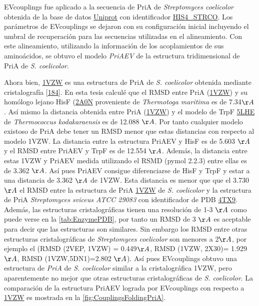 \documentclass[12pt,twoside]{reedthesis}
\begin{document}
  EVcouplings fue aplicado a la secuencia de PriA de \emph{Streptomyces
  coelicolor} obtenida de la base de datos
  \href{https://www.uniprot.org/}{Uniprot} con identificador
  \href{https://www.uniprot.org/uniprot/P16250}{HIS4\_STRCO}. Los
  parámetros de EVcouplings se dejaron con su configuración inicial
  incluyendo el umbral de recuperación para las secuencias utilizadas en
  el alineamiento. Con este alineamiento, utilizando la información de los
  acoplamientos de sus aminoácidos, se obtuvo el modelo \emph{PriAEV} de
  la estructura tridimensional de PriA de \emph{S. coelicolor}.
  
  Ahora bien, \href{https://www.rcsb.org/structure/1vzw}{1VZW} es una
  estructura de PriA de \emph{S. coelicolor} obtenida mediante
  cristalografía {[}\protect\hyperlink{ref-kuper_twofold_2005}{184}{]}. En
  esta tesis calculé que el RMSD entre PriA
  (\href{https://www.rcsb.org/structure/1vzw}{1VZW}) y su homólogo lejano
  HisF (\href{http://www.rcsb.org/structure/2A0N}{2A0N} proveniente de
  \emph{Thermotoga maritima} es de 7.34\({\AA}\). Así mismo la distancia
  obtenida entre PriA (\href{https://www.rcsb.org/structure/1vzw}{1VZW}) y
  el modelo de TrpF \href{http://www.rcsb.org/structure/5LHE}{5LHE} de
  \emph{Thermococcus kodakaraensis} es de 12.088 \({\AA}\). Por tanto
  cualquier modelo existoso de PriA debe tener un RMSD menor que estas
  distancias con respecto al modelo 1VZW. La distancia entre la estructura
  PriAEV y HisF es de 5.603 \({\AA}\) y el RMSD entre PriAEV y TrpF es de
  12.554 \({\AA}\). Además, la distancia entre estas 1VZW y PriAEV medida
  utilizando el RSMD (pymol 2.2.3) entre ellas es de 3.362 \({\AA}\). Así
  pues PriAEV consigue diferenciarse de HisF y TrpF y estar a una
  distancia de 3.362 \({\AA}\) de 1VZW. Esta distancia es menor que que el
  3.730 \({\AA}\) el RMSD entre la estructura de PriA
  \href{https://www.rcsb.org/structure/1vzw}{1VZW} de \emph{S. coelicolor}
  y la estructura de PriA \emph{Streptomyces sviceus ATCC 29083} con
  identificador de PDB \href{https://www.rcsb.org/structure/4TX9}{4TX9}.
  Además, las estructuras cristalográficas tienen una resolución de 1-3
  \({\AA}\) como puede verse en la \autoref{tab:EnzymePDB}, por tanto un
  RMSD de 3 \({\AA}\) es aceptable para decir que las estructuras son
  similares. Sin embargo los RMSD entre otras estructuras cristalográficas
  de \emph{Streptomyces coelicolor} son menores a 2\({\AA}\), por ejemplo
  el (RMSD (2VEP, 1VZW) = 0.449\({\AA}\), RMSD (1VZW, 2X30)= 1.929
  \({\AA}\), RMSD (1VZW,5DN1)=2.802 \({\AA}\)). Así pues EVcouplings
  obtuvo una estructura de \emph{PriA} de \emph{S. coelicolor} similar a
  la cristalográfica 1VZW, pero aparentemente no mejor que otras
  estructuras cristalográficas de \emph{S. coelicolor}. La comparación de
  la estructura PriAEV lograda por EVcouplings con respecto a
  \href{https://www.rcsb.org/structure/1vzw}{1VZW} es mostrada en la
  \autoref{fig:CouplingsFoldingPriA}.
  
\end{document}
